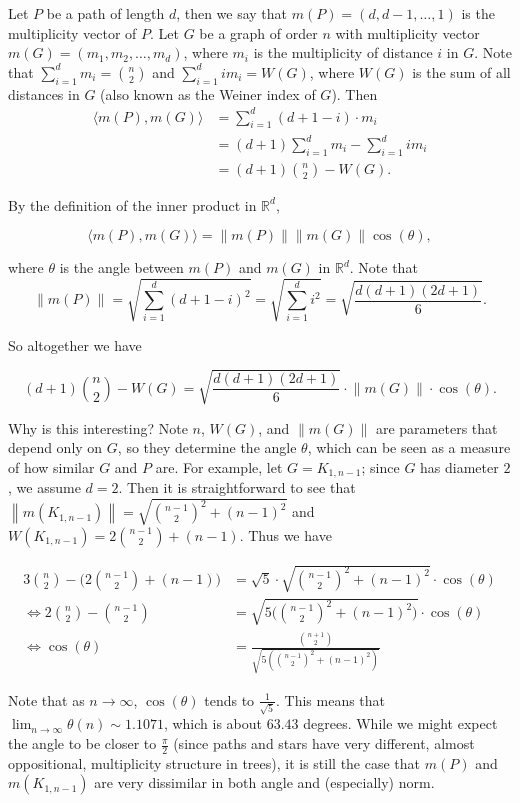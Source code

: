 \documentclass[12]{article}
\newcommand{\R}{\mathbb{R}}
\newcommand{\norm}[1]{\left\lVert #1 \right\rVert}
\theoremstyle{definition}
\begin{document}
	Let $P$ be a path of length $d$, then we say that $m(P) = (d, d-1, \ldots, 1)$ is the multiplicity vector of $P$.  Let $G$ be a graph of order $n$ with multiplicity vector $m(G) = (m_1, m_2, \ldots, m_d)$, where $m_i$ is the multiplicity of distance $i$ in $G$.  Note that $\sum_{i=1}^d m_i = {n \choose 2}$ and $\sum_{i=1}^d im_i = W(G)$, where $W(G)$ is the sum of all distances in $G$ (also known as the Weiner index of $G$).  Then 
	\begin{align*}
		\langle m(P), m(G) \rangle &= \sum_{i=1}^d(d+1-i)\cdot m_i	\\
		&= (d+1)\sum_{i=1}^d m_i - \sum_{i=1}^d im_i	\\
		&= (d+1){n \choose 2} - W(G).
	\end{align*}
	
	By the definition of the inner product in $\R^d$,
	
	$$ \langle m(P), m(G) \rangle = \norm{m(P)} \norm{m(G)} \cos(\theta),$$
	
	where $\theta$ is the angle between $m(P)$ and $m(G)$ in $\R^d$.  Note that 
	$$\norm{m(P)} = \sqrt{\sum_{i=1}^d (d+1-i)^2} = \sqrt{\sum_{i=1}^d i^2} = \sqrt{\frac{d(d+1)(2d+1)}{6}}.$$
	
	So altogether we have
	
	$$(d+1){n \choose 2} - W(G) = \sqrt{\frac{d(d+1)(2d+1)}{6}} \cdot \norm{m(G)} \cdot \cos(\theta).$$
	
	Why is this interesting?  Note $n$, $W(G)$, and $\norm{m(G)}$ are parameters that depend only on $G$, so they determine the angle $\theta$, which can be seen as a measure of how similar $G$ and $P$ are.  For example, let $G = K_{1,n-1}$; since $G$ has diameter $2$, we assume $d=2$.  Then it is straightforward to see that $\norm{m(K_{1,n-1})} = \sqrt{{n-1 \choose 2}^2 + (n-1)^2}$ and $W(K_{1,n-1}) = 2{n-1 \choose 2} + (n-1)$.  Thus we have
	
	\begin{align*}
		3{n \choose 2} - \biggr(2{n-1 \choose 2} + (n-1)\biggr) &= \sqrt{5} \cdot \sqrt{{n-1 \choose 2}^2 + (n-1)^2} \cdot \cos(\theta)	\\
		\Leftrightarrow 2 {n \choose 2} - {n-1 \choose 2} &= \sqrt{5 \biggr({n-1 \choose 2}^2 + (n-1)^2\biggr)} \cdot \cos(\theta)	\\
		\Leftrightarrow \cos(\theta) &= \frac{{n+1 \choose 2}}{\sqrt{5({n-1 \choose 2}^2 + (n-1)^2)}}
	\end{align*}
	
	Note that as $n \rightarrow \infty$, $\cos(\theta)$ tends to $\tfrac{1}{\sqrt{5}}$.  This means that $\lim_{n \rightarrow \infty} \theta(n) \sim 1.1071$, which is about $63.43$ degrees.  While we might expect the angle to be closer to $\tfrac{\pi}{2}$ (since paths and stars have very different, almost oppositional, multiplicity structure in trees), it is still the case that $m(P)$ and $m(K_{1,n-1})$ are very dissimilar in both angle and (especially) norm.
	
\end{document}
